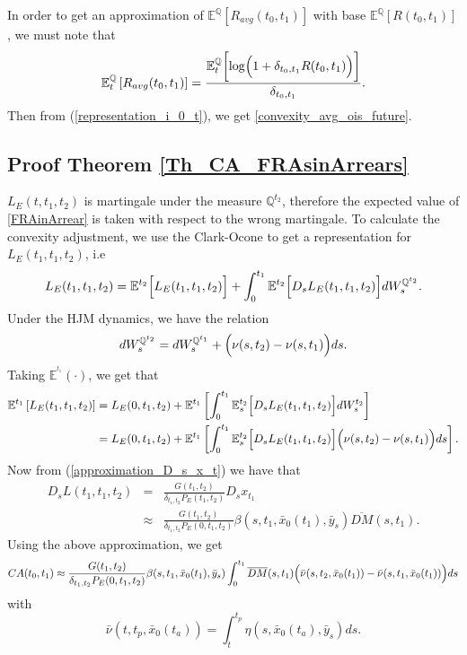 \documentclass[a4paper,10pt]{article}
\newcommand{\1}{\mathbf{1}}
\begin{document}
In order to get an approximation of $\mathbb{E}^{\mathbb{Q}}\left[R_{avg}(t_0,t_1)\right]$ with base $\mathbb{E}^{\mathbb{Q}}\left[R(t_0,t_1)\right]$, we must note that 
\begin{equation*}
\mathbb{E}_t^{\mathbb{Q}}\left[R_{avg}(t_0,t_1)\right] = \frac{\mathbb{E}_t^{\mathbb{Q}}\biggl[ \log\Bigl(1+ \delta_{t_0,t_1} R(t_0,t_1)\Bigr)\biggr]}{ \delta_{t_0,t_1}}.
\end{equation*}
Then from (\ref{representation_i_0_t}), we get \eqref{convexity_avg_ois_future}.

\subsection{Proof Theorem \ref{Th_CA_FRAsinArrears}}\label{Proof_CA_FRAsinArrears}
$L_{E}(t,t_1,t_2)$ is martingale under the measure $\mathbb{Q}^{t_2}$, therefore the expected value of \eqref{FRAinArrear} is taken with respect to the wrong martingale. To calculate the convexity adjustment, we use the Clark-Ocone to get a representation for $L_{E}(t_1,t_1,t_2)$, i.e
\begin{equation}\label{general_convexity_fras}
L_{E}(t_1,t_1,t_2) = \mathbb{E}^{t_2}\Bigl[L_{E}(t_1,t_1,t_2) \Bigr] + \int_{0}^{t_1} \mathbb{E}^{t_2}\Bigl[D_s L_{E}(t_1,t_1,t_2) \Bigr] dW^{\mathbb{Q}^{t_2}}_{s}.
\end{equation}
Under the HJM dynamics, we have the relation
\begin{equation*}
dW^{\mathbb{Q}^{t_2}}_s = dW^{\mathbb{Q}^{t_1}}_s + \Bigl(\nu(s,t_2) - \nu(s,t_1)\Bigr) ds. 
\end{equation*}
Taking $\mathbb{E}^{^{t_1}}(\cdot)$, we get that
\begin{align*}
\mathbb{E}^{t_1}\left[L_{E}(t_1,t_1,t_2) \right] &= L_{E}(0,t_1,t_2) + \mathbb{E}^{t_1}\left[ \int_{0}^{t_1} \mathbb{E}_s^{t_2}\Bigl[D_s L_{E}(t_1,t_1,t_2)\Bigr] dW^{t_2}_{s}\right]\\
&= L_{E}(0,t_1,t_2) + \mathbb{E}^{t_1}\left[ \int_{0}^{t_1} \mathbb{E}_s^{t_2}\Bigl[D_s L_{E}(t_1,t_1,t_2) \Bigr] \Bigl(\nu(s,t_2)-\nu(s,t_1)\Bigr) ds \right].
\end{align*}
Now from (\ref{approximation_D_s_x_t}) we have that 
\begin{eqnarray*}
D_s L(t_1,t_1,t_2) &=& \frac{G(t_1,t_2)}{\delta_{t_1,t_2}P_{E}(t_1,t_2)} D_s x_{t_1}\\
&\approx& \frac{G(t_1,t_2)}{\delta_{t_1,t_2}P_{E}(0,t_1,t_2)} \beta(s,t_1, \bar{x}_0(t_1), \bar{y}_s)\overline{DM}(s,t_1).
\end{eqnarray*}
Using the above approximation, we get
\begin{equation*}
CA(t_0,t_1) \approx \frac{G(t_1,t_2)}{\delta_{t_1,t_2}P_{E}(0,t_1,t_2)} \beta(s,t_1, \bar{x}_0(t_1), \bar{y}_s) \int_{0}^{t_1} \overline{DM}(s,t_1) \Bigl(\bar{\nu}(s,t_2,\bar{x}_{0}(t_1))-\bar{\nu}(s,t_1,\bar{x}_{0}(t_1))\Bigr) ds
\end{equation*}
with 
\begin{equation*}
\bar{\nu}(t,t_p, \bar{x}_0(t_a))= \int_{t}^{t_p} \eta(s,\bar{x}_0(t_a),\bar{y}_s) ds.   
\end{equation*}
\end{document}
